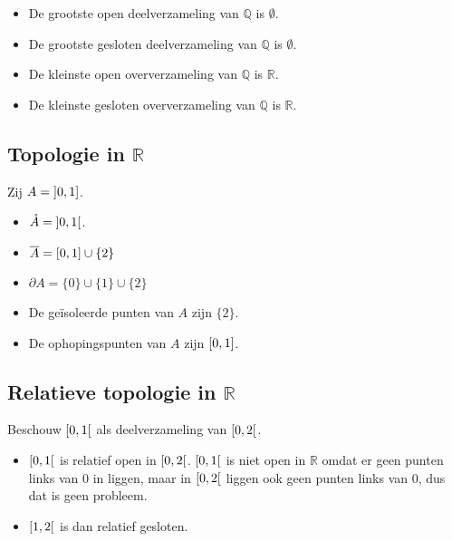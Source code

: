 \documentclass[main.tex]{subfiles}
\begin{document}
\begin{vb}
  \begin{itemize}
  \item De grootste open deelverzameling van $\mathbb{Q}$ is $\emptyset$.
  \item De grootste gesloten deelverzameling van $\mathbb{Q}$ is $\emptyset$.
  \item De kleinste open oververzameling van $\mathbb{Q}$ is $\mathbb{R}$.
  \item De kleinste gesloten oververzameling van $\mathbb{Q}$ is $\mathbb{R}$.
  \end{itemize}
\feed
\end{vb}

\subsection{Topologie in $\mathbb{R}$}

\begin{vb}
  Zij $A= \interval[open left]{0}{1}$.
  \begin{itemize}
  \item $\mathring{A} = \interval[open]{0}{1}$.
  \item $\overline{A} = \interval{0}{1} \cup \{2\}$
  \item $\partial{A} = \{0\} \cup \{1\} \cup \{2\}$
  \item De ge\"isoleerde punten van $A$ zijn $\{2\}$.
  \item De ophopingspunten van $A$ zijn $\interval{0}{1}$.
  \end{itemize}
\end{vb}

\subsection{Relatieve topologie in $\mathbb{R}$}

\begin{vb}
  Beschouw $\interval[open right]{0}{1}$ als deelverzameling van $\interval[open right]{0}{2}$.
  \begin{itemize}
  \item $\interval[open right]{0}{1}$ is relatief open in $\interval[open right]{0}{2}$.
    $\interval[open right]{0}{1}$ is niet open in $\mathbb{R}$ omdat er geen punten links van $0$ in liggen, maar in $\interval[open right]{0}{2}$ liggen ook geen punten links van $0$, dus dat is geen probleem.
  \item $\interval[open right]{1}{2}$ is dan relatief gesloten.
  \end{itemize}
\end{vb}
\end{document}
